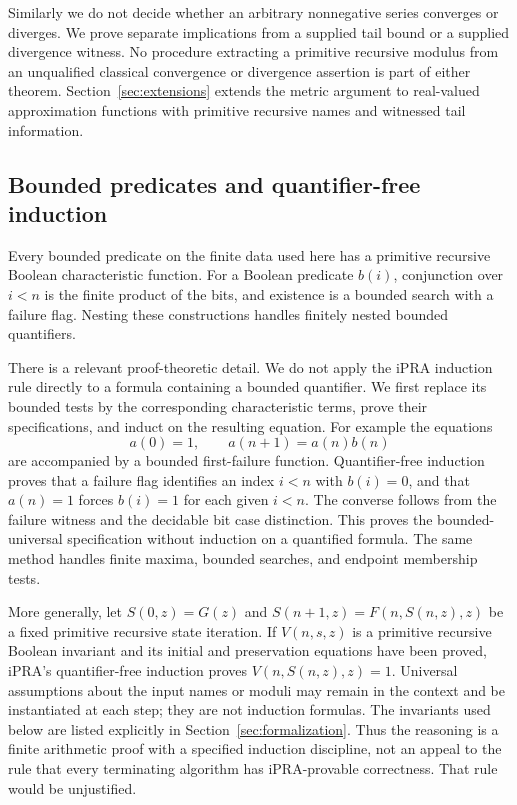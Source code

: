 Similarly we do not decide whether an arbitrary nonnegative series
converges or diverges.  We prove separate implications from a supplied
tail bound or a supplied divergence witness.  No procedure extracting a
primitive recursive modulus from an unqualified classical convergence or
divergence assertion is part of either theorem.  Section~\ref{sec:extensions}
extends the metric argument to real-valued approximation functions with
primitive recursive names and witnessed tail information.

\subsection{Bounded predicates and quantifier-free induction}

Every bounded predicate on the finite data used here has a primitive
recursive Boolean characteristic function.  For a Boolean predicate
$b(i)$, conjunction over $i<n$ is the finite product of the bits, and
existence is a bounded search with a failure flag.  Nesting these
constructions handles finitely nested bounded quantifiers.

There is a relevant proof-theoretic detail.  We do not apply the iPRA
induction rule directly to a formula containing a bounded quantifier.
We first replace its bounded tests by the corresponding characteristic
terms, prove their specifications, and induct on the resulting equation.
For example the equations
\[
 a(0)=1,\qquad a(n+1)=a(n)b(n)
\]
are accompanied by a bounded first-failure function.  Quantifier-free
induction proves that a failure flag identifies an index $i<n$ with
$b(i)=0$, and that $a(n)=1$ forces $b(i)=1$ for each given $i<n$.
The converse follows from the failure witness and the decidable bit
case distinction.  This proves the bounded-universal specification
without induction on a quantified formula.  The same method handles
finite maxima, bounded searches, and endpoint membership tests.

More generally, let $S(0,z)=G(z)$ and
$S(n+1,z)=F(n,S(n,z),z)$ be a fixed primitive recursive state iteration.
If $V(n,s,z)$ is a primitive recursive Boolean invariant and its initial
and preservation equations have been proved, iPRA's quantifier-free
induction proves $V(n,S(n,z),z)=1$.  Universal assumptions about the input
names or moduli may remain in the context and be instantiated at each
step; they are not induction formulas.  The invariants used below are
listed explicitly in Section~\ref{sec:formalization}.  Thus the reasoning
is a finite arithmetic proof with a specified induction discipline, not
an appeal to the rule that every terminating algorithm has iPRA-provable
correctness.  That rule would be unjustified.

